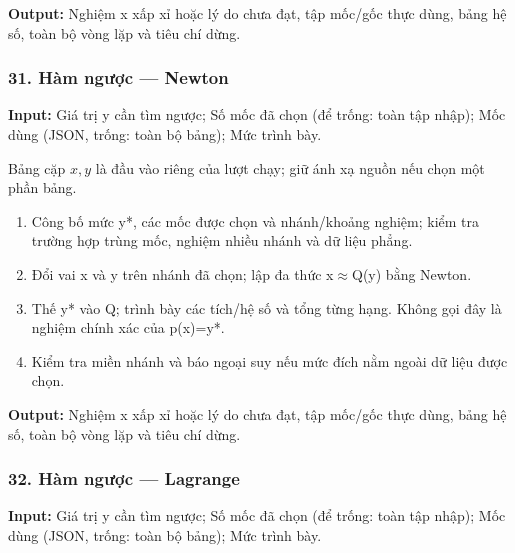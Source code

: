 \textbf{Output:} Nghiệm x xấp xỉ hoặc lý do chưa đạt,\allowbreak{} tập mốc/\allowbreak{}gốc thực dùng,\allowbreak{} bảng hệ số,\allowbreak{} toàn bộ vòng lặp và tiêu chí dừng.

\examplebreak\subsubsection*{31. Hàm ngược — Newton}

\textbf{Input:} Giá trị y cần tìm ngược;\allowbreak{} Số mốc đã chọn (\allowbreak{}để trống: toàn tập nhập);\allowbreak{} Mốc dùng (\allowbreak{}JSON,\allowbreak{} trống: toàn bộ bảng);\allowbreak{} Mức trình bày.

Bảng cặp $x,y$ là đầu vào riêng của lượt chạy; giữ ánh xạ nguồn nếu chọn một phần bảng.

\begin{enumerate}

\item Công bố mức y*,\allowbreak{} các mốc được chọn và nhánh/\allowbreak{}khoảng nghiệm;\allowbreak{} kiểm tra trường hợp trùng mốc,\allowbreak{} nghiệm nhiều nhánh và dữ liệu phẳng.

\item Đổi vai x và y trên nhánh đã chọn;\allowbreak{} lập đa thức x\ensuremath{\approx}Q(\allowbreak{}y) bằng Newton.

\item Thế y* vào Q;\allowbreak{} trình bày các tích/\allowbreak{}hệ số và tổng từng hạng. Không gọi đây là nghiệm chính xác của p(\allowbreak{}x)=\allowbreak{}y*.

\item Kiểm tra miền nhánh và báo ngoại suy nếu mức đích nằm ngoài dữ liệu được chọn.

\end{enumerate}

\textbf{Output:} Nghiệm x xấp xỉ hoặc lý do chưa đạt,\allowbreak{} tập mốc/\allowbreak{}gốc thực dùng,\allowbreak{} bảng hệ số,\allowbreak{} toàn bộ vòng lặp và tiêu chí dừng.

\examplebreak\subsubsection*{32. Hàm ngược — Lagrange}

\textbf{Input:} Giá trị y cần tìm ngược;\allowbreak{} Số mốc đã chọn (\allowbreak{}để trống: toàn tập nhập);\allowbreak{} Mốc dùng (\allowbreak{}JSON,\allowbreak{} trống: toàn bộ bảng);\allowbreak{} Mức trình bày.

